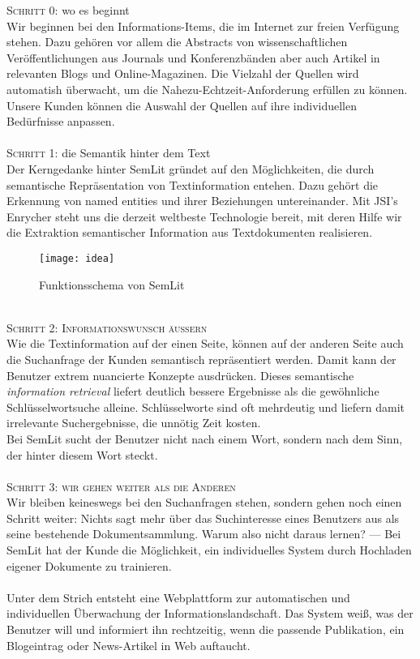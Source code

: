 \textsc{Schritt 0:} wo es beginnt\\
Wir beginnen bei den Informations-Items, die im Internet zur freien Verfügung stehen. Dazu gehören vor allem die Abstracts von wissenschaftlichen Veröffentlichungen aus Journals und Konferenzbänden aber auch Artikel in relevanten Blogs und Online-Magazinen. Die Vielzahl der Quellen wird automatish überwacht, um die Nahezu-Echtzeit-Anforderung erfüllen zu können.\\
{\color{orange}Unsere Kunden können die Auswahl der Quellen auf ihre individuellen Bedürfnisse anpassen. }
\\
\\
\textsc{Schritt 1:} die Semantik hinter dem Text\\
Der Kerngedanke hinter SemLit gründet auf den Möglichkeiten, die durch semantische Repräsentation von Textinformation entehen. Dazu gehört die Erkennung von named entities und ihrer Beziehungen untereinander. Mit JSI's Enrycher steht uns die derzeit weltbeste Technologie bereit, mit deren Hilfe wir die Extraktion semantischer Information aus Textdokumenten realisieren. 
\\
\begin{figure}[h!]
\centering
\texttt{[image: idea]}
\caption{Funktionsschema von SemLit}
\label{fig:idea}
\end{figure}
\\
\textsc{Schritt 2: Informationswunsch äußern}\\
Wie die Textinformation auf der einen Seite, können auf der anderen Seite auch die Suchanfrage der Kunden semantisch repräsentiert werden. Damit kann der Benutzer extrem nuancierte Konzepte ausdrücken. 
Dieses semantische \emph{information retrieval} liefert deutlich bessere Ergebnisse als die gewöhnliche Schlüsselwortsuche alleine. Schlüsselworte sind oft mehrdeutig und liefern damit irrelevante Suchergebnisse, die unnötig Zeit kosten. \\
{\color{orange}Bei SemLit sucht der Benutzer nicht nach einem Wort, sondern nach dem Sinn, der hinter diesem Wort steckt.}
\\
\\
\textsc{Schritt 3: wir gehen weiter als die Anderen}\\
Wir bleiben keineswegs bei den Suchanfragen stehen, sondern gehen noch einen Schritt weiter: Nichts sagt mehr über das Suchinteresse eines Benutzers aus als seine bestehende Dokumentsammlung. Warum also nicht daraus lernen? --- Bei SemLit hat der Kunde die Möglichkeit, ein individuelles System durch Hochladen eigener Dokumente zu trainieren.
\\
\\
{\color{orange}Unter dem Strich entsteht eine Webplattform zur automatischen und individuellen Überwachung der Informationslandschaft. Das System weiß, was der Benutzer will und informiert ihn rechtzeitig, wenn die passende Publikation, ein Blogeintrag oder News-Artikel in Web auftaucht.}

